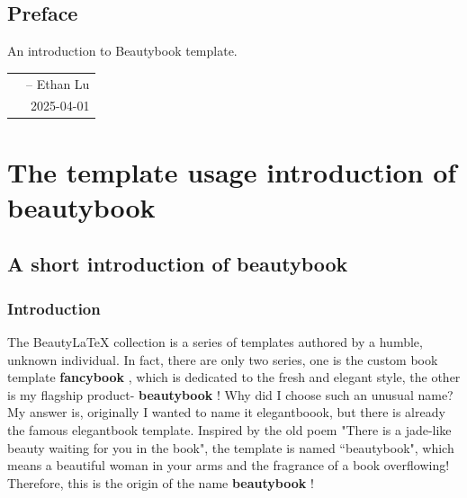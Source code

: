 \documentclass[lang=en,12pt]{beautybook}
\begin{document}
\frontmatter
{}

{%
\thispagestyle{empty}
\chapter*{Preface}
An introduction to Beautybook template.


\hfill
\begin{tabular}{lr}
    &-- Ethan Lu\\ 
    &2025-04-01
\end{tabular}
\clearpage}

\thispagestyle{empty}
\tableofcontents\let\cleardoublepage\clearpage

\mainmatter
{}

\part{The template usage introduction of \textbf{beautybook}}

\chapter{A short introduction of \textbf{beautybook}}

\section{Introduction}

The Beauty\LaTeX{} collection is a series of templates authored by a humble, unknown individual. In fact, there are only two series, one is the custom book template \textbf{fancybook } , which is dedicated to the fresh and elegant style, the other is my flagship product-\textbf{ beautybook } !  Why did I choose such an unusual name? My answer is, originally I wanted to name it elegantboook, but there is already the famous elegantbook template. Inspired by the old poem "There is a jade-like beauty waiting for you in the book", the template is named ``beautybook", which means a beautiful woman in your arms and the fragrance of a book overflowing! Therefore, this is the origin of the name \textbf{beautybook } !
\end{document}
